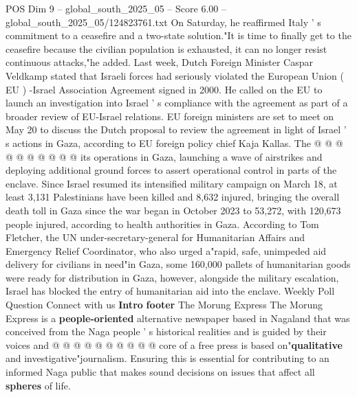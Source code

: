 \begin{textsample}{POS Dim 9 – global\_south\_2025\_05 – Score 6.00 – global\_south\_2025\_05/124823761.txt}
On Saturday, he reaffirmed Italy ' s commitment to a ceasefire and a two-state solution."It is time to finally get to the ceasefire because the civilian population is exhausted, it can no longer resist continuous attacks,"he added.
Last week, Dutch Foreign Minister Caspar Veldkamp stated that Israeli forces had seriously violated the European Union ( EU ) -Israel Association Agreement signed in 2000.
He called on the EU to launch an investigation into Israel ' s compliance with the agreement as part of a broader review of EU-Israel relations.
EU foreign ministers are set to meet on May 20 to discuss the Dutch proposal to review the agreement in light of Israel ' s actions in Gaza, according to EU foreign policy chief Kaja Kallas.
The @ @ @ @ @ @ @ @ @ @ its operations in Gaza, launching a wave of airstrikes and deploying additional ground forces to assert operational control in parts of the enclave.
Since Israel resumed its intensified military campaign on March 18, at least 3,131 Palestinians have been killed and 8,632 injured, bringing the overall death toll in Gaza since the war began in October 2023 to 53,272, with 120,673 people injured, according to health authorities in Gaza.
According to Tom Fletcher, the UN under-secretary-general for Humanitarian Affairs and Emergency Relief Coordinator, who also urged a"rapid, safe, unimpeded aid delivery for civilians in need"in Gaza, some 160,000 pallets of humanitarian goods were ready for distribution in Gaza, however, alongside the military escalation, Israel has blocked the entry of humanitarian aid into the enclave.
Weekly Poll Question Connect with us \textbf{Intro} \textbf{footer} The Morung Express The Morung Express is a \textbf{people-oriented} alternative newspaper based in Nagaland that was conceived from the Naga people ' s historical realities and is guided by their voices and @ @ @ @ @ @ @ @ @ @ core of a free press is based on"\textbf{qualitative} and investigative"journalism.
Ensuring this is essential for contributing to an informed Naga public that makes sound decisions on issues that affect all \textbf{spheres} of life.

\end{textsample}
